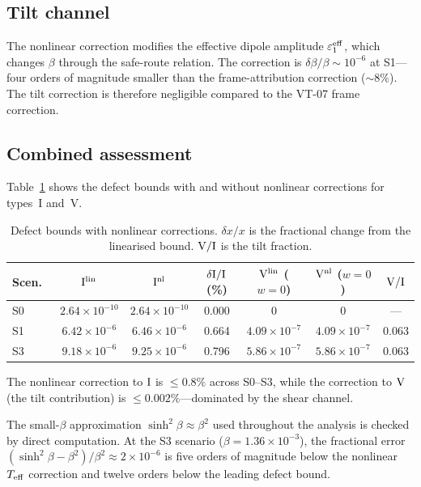 \subsection{Tilt channel}\label{sec:tilt-channel}

The nonlinear correction modifies the effective dipole amplitude
$\varepsilon_1^{\mathrm{eff}}$, which changes $\beta$ through the
safe-route relation.  The correction is
$\delta\beta/\beta \sim 10^{-6}$ at S1---four orders of
magnitude smaller than the frame-attribution correction
($\sim 8\%$).  The tilt correction is therefore negligible
compared to the VT-07 frame correction.


\subsection{Combined assessment}\label{sec:combined}

Table~\ref{tab:defect-prop} shows the defect bounds with and
without nonlinear corrections for types~I and~V.

\begin{table}[ht]
\caption{Defect bounds with nonlinear corrections.
$\delta x/x$ is the fractional change from the linearised bound.
$\mathrm{V}/\mathrm{I}$ is the tilt fraction.}
\label{tab:defect-prop}
\centering\footnotesize\setlength{\tabcolsep}{3.5pt}
\begin{tabular}{lcccccc}
\toprule
Scen.\ & $\mathrm{I}^{\mathrm{lin}}$ & $\mathrm{I}^{\mathrm{nl}}$
  & $\delta\mathrm{I}/\mathrm{I}$ (\%)
  & $\mathrm{V}^{\mathrm{lin}}$ ($w{=}0$)
  & $\mathrm{V}^{\mathrm{nl}}$ ($w{=}0$)
  & $\mathrm{V}/\mathrm{I}$ \\
\midrule
S0  & $2.64\times10^{-10}$ & $2.64\times10^{-10}$ & 0.000
    & 0 & 0 & --- \\
S1  & $6.42\times10^{-6}$  & $6.46\times10^{-6}$  & 0.664
    & $4.09\times10^{-7}$ & $4.09\times10^{-7}$ & 0.063 \\
S3  & $9.18\times10^{-6}$  & $9.25\times10^{-6}$  & 0.796
    & $5.86\times10^{-7}$ & $5.86\times10^{-7}$ & 0.063 \\
\bottomrule
\end{tabular}
\end{table}

The nonlinear correction to $\mathrm{I}$ is $\leq 0.8\%$ across
S0--S3, while the correction to $\mathrm{V}$ (the tilt
contribution) is $\leq 0.002\%$---dominated by the shear
channel.

The small-$\beta$ approximation
$\sinh^2\!\beta \approx \beta^2$ used throughout the analysis
is checked by direct computation.  At the S3 scenario
($\beta = 1.36 \times 10^{-3}$), the fractional error
$(\sinh^2\!\beta - \beta^2)/\beta^2 \approx 2 \times 10^{-6}$
is five orders of magnitude below the nonlinear $T_{\mathrm{eff}}$
correction and twelve orders below the leading defect bound.


